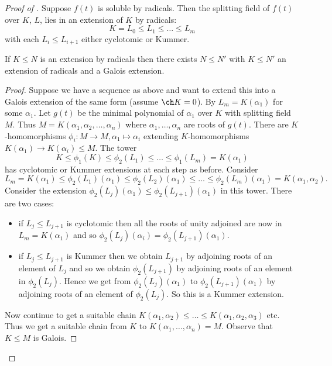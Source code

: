 \documentclass[a4paper]{article}
\begin{document}
\begin{proof}[Proof of ]
  Suppose \(f(t)\) is soluble by radicals. Then the splitting field of \(f(t)\) over \(K\), \(L\), lies in an extension of \(K\) by radicals:
  \[
    K = L_0 \leq L_1 \leq \dots \leq L_m
  \]
  with each \(L_i \leq L_{i + 1}\) either cyclotomic or Kummer.

  \begin{lemma}
    If \(K \leq N\) is an extension by radicals then there exists \(N \leq N'\) with \(K \leq N'\) an extension of radicals and a Galois extension.
  \end{lemma}

  \begin{proof}
    Suppose we have a sequence as above and want to extend this into a Galois extension of the same form (assume \(\ch K = 0\)). By  \(L_m = K(\alpha_1)\) for some \(\alpha_1\). Let \(g(t)\) be the minimal polynomial of \(\alpha_1\) over \(K\) with splitting field \(M\). Thus \(M = K(\alpha_1, \alpha_2, \dots, \alpha_n)\) where \(\alpha_1, \dots, \alpha_n\) are roots of \(g(t)\). There are \(K\)-homomorphisms \(\phi_i: M \to M, \alpha_1 \mapsto \alpha_i\) extending \(K\)-homomorphisms \(K(\alpha_1) \to K(\alpha_i) \leq M\). The tower
    \[
      K \leq \phi_1(K) \leq \phi_2(L_1) \leq \dots \leq \phi_1(L_m) = K(\alpha_1)
    \]
    has cyclotomic or Kummer extensions at each step as before. Consider
    \[
      L_m = K(\alpha_1) \leq \phi_2(L_1)(\alpha_1) \leq \phi_2(L_2)(\alpha_1) \leq \dots \leq \phi_2(L_m)(\alpha_1) = K(\alpha_1, \alpha_2).
    \]
    Consider the extension \(\phi_2(L_j)(\alpha_1) \leq \phi_2(L_{j + 1})(\alpha_1)\) in this tower. There are two cases:
    \begin{itemize}
    \item if \(L_j \leq L_{j + 1}\) is cyclotomic then all the roots of unity adjoined are now in \(L_m = K(\alpha_1)\) and so \(\phi_2(L_j)(\alpha_i) = \phi_2(L_{j + 1})(\alpha_1)\).
    \item if \(L_j \leq L_{j + 1}\) is Kummer then we obtain \(L_{j + 1}\) by adjoining roots of an element of \(L_j\) and so we obtain \(\phi_2(L_{j + 1})\) by adjoining roots of an element in \(\phi_2(L_j)\). Hence we get from \(\phi_2(L_j)(\alpha_1)\) to \(\phi_2(L_{j + 1})(\alpha_1)\) by adjoining roots of an element of \(\phi_2(L_j)\). So this is a Kummer extension.\
    \end{itemize}

    Now continue to get a suitable chain \(K(\alpha_1,\alpha_2) \leq \dots \leq K(\alpha_1, \alpha_2, \alpha_3)\) etc. Thus we get a suitable chain from \(K\) to \(K(\alpha_1, \dots, \alpha_n) = M\). Observe that \(K \leq M\) is Galois.
  \end{proof}


\end{proof}
\end{document}
